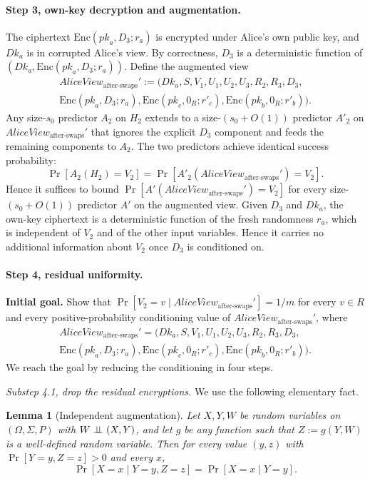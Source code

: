 \documentclass[11pt]{article}
\newtheorem{lemma}{Lemma}
\newcommand{\indep}{\mathrel{\perp\mkern-9mu\perp}}
\newcommand{\Encf}{\mathrm{Enc}}
\newcommand{\AliceViewHyb}{\mathit{AliceView}_{\textrm{after-swaps}}'}
\newcommand{\Dk}{\mathit{Dk}}
\newcommand{\pk}{\mathit{pk}}
\begin{document}
\paragraph{Step 3, own-key decryption and augmentation.} The ciphertext $\Encf(\pk_a, D_3; r_a)$ is encrypted under Alice's own public key, and $\Dk_a$ is in corrupted Alice's view. By correctness, $D_3$ is a deterministic function of $(\Dk_a,\Encf(\pk_a,D_3;r_a))$. Define the augmented view
\begin{multline*}
\AliceViewHyb := \big( \Dk_a, S, V_1, U_1, U_2, U_3, R_2, R_3, D_3, \\
\Encf(\pk_a, D_3; r_a), \Encf(\pk_c, 0_R; r'_c), \Encf(\pk_b, 0_R; r'_b) \big).
\end{multline*}
Any size-$s_0$ predictor $A_2$ on $H_2$ extends to a size-$(s_0 + O(1))$ predictor $A'_2$ on $\AliceViewHyb$ that ignores the explicit $D_3$ component and feeds the remaining components to $A_2$. The two predictors achieve identical success probability:
\[
\Pr[A_2(H_2) = V_2] = \Pr[A'_2(\AliceViewHyb) = V_2].
\]
Hence it suffices to bound $\Pr[A'(\AliceViewHyb) = V_2]$ for every size-$(s_0 + O(1))$ predictor $A'$ on the augmented view. Given $D_3$ and $\Dk_a$, the own-key ciphertext is a deterministic function of the fresh randomness $r_a$, which is independent of $V_2$ and of the other input variables. Hence it carries no additional information about $V_2$ once $D_3$ is conditioned on.

\paragraph{Step 4, residual uniformity.}

\textbf{Initial goal.} Show that $\Pr[V_2 = v \mid \AliceViewHyb] = 1/m$ for every $v \in R$ and every positive-probability conditioning value of $\AliceViewHyb$, where
\begin{multline*}
\AliceViewHyb = \big( \Dk_a, S, V_1, U_1, U_2, U_3, R_2, R_3, D_3, \\
\Encf(\pk_a, D_3; r_a), \Encf(\pk_c, 0_R; r'_c), \Encf(\pk_b, 0_R; r'_b) \big).
\end{multline*}
We reach the goal by reducing the conditioning in four steps.

\medskip

\textit{Substep 4.1, drop the residual encryptions.} We use the following elementary fact.

\begin{lemma}[Independent augmentation]\label{lem:indep-aug}
Let $X, Y, W$ be random variables on $(\Omega, \Sigma, P)$ with $W \indep (X, Y)$, and let $g$ be any function such that $Z := g(Y, W)$ is a well-defined random variable. Then for every value $(y, z)$ with $\Pr[Y = y, Z = z] > 0$ and every $x$,
\[
\Pr[X = x \mid Y = y, Z = z] = \Pr[X = x \mid Y = y].
\]
\end{lemma}
\end{document}

